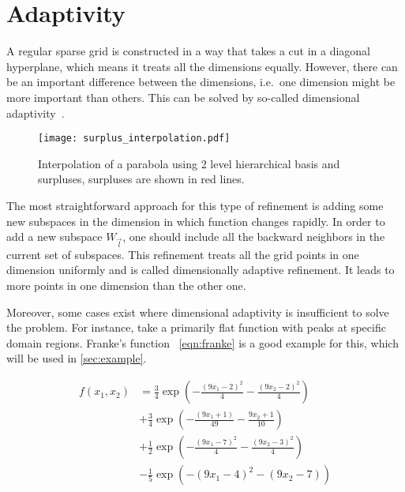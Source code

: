 \section{Adaptivity}\label{sec:adaptivity}

A regular sparse grid is constructed in a way that takes a cut in a diagonal hyperplane, which means
it treats all the dimensions equally. However, there can be an important difference between the dimensions,
i.e.~one dimension might be more important than others. This can be solved by so-called dimensional adaptivity~\cite{Gerstner2003}.

\begin{figure}
    \centering
    \texttt{[image: surplus\_interpolation.pdf]}
    \caption{Interpolation of a parabola using 2 level hierarchical basis and surpluses, surpluses are shown in red lines.}
    \label{fig:interpolation_surplus}
\end{figure}

The most straightforward approach for this type of refinement is adding some new subspaces in the dimension in which function changes rapidly. In order to add a new subspace \(W_{\vec{l}}\), one should include all the backward neighbors in the current set of subspaces. This refinement treats all the grid points in one dimension uniformly and is called dimensionally adaptive refinement. It leads to more points in one dimension than the other one.

Moreover, some cases exist where dimensional adaptivity is insufficient to solve the problem. For instance, take a primarily flat function with peaks at specific domain regions. Franke's function~\cite{Franke1979} \cref{eqn:franke} is a good example for this, which will be used in \cref{sec:example}.

\begin{equation}
    \begin{aligned}
        f(x_1,x_2) & = \frac{3}{4} \exp \left( - \frac{(9x_1-2)^2}{4} - \frac{(9x_2-2)^2}{4} \right) \\
                   & + \frac{3}{4} \exp  \left( - \frac{(9x_1+1)}{49} - \frac{9x_2+1}{10}\right)     \\
                   & + \frac{1}{2} \exp \left( -\frac{(9x_1-7)^2}{4} - \frac{(9x_2-3)^2}{4} \right)  \\
                   & - \frac{1}{5} \exp \left( - (9x_1-4 )^2 -(9x_2-7)\right)
    \end{aligned}
    \label{eqn:franke}
\end{equation}

